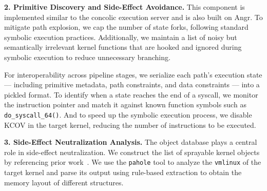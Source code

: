 \noindent\textbf{2. Primitive Discovery and Side-Effect Avoidance.}
This component is implemented similar to the concolic execution server and is also built on Angr. To mitigate path explosion, we cap the number of state forks, following standard symbolic execution practices. Additionally, we maintain a list of noisy but semantically irrelevant kernel functions that are hooked and ignored during symbolic execution to reduce unnecessary branching.

For interoperability across pipeline stages, we serialize each path's execution state --- including primitive metadata, path constraints, and data constraints --- into a pickled format. To identify when a state reaches the end of a syscall, we monitor the instruction pointer and match it against known function symbols such as \texttt{do\_syscall\_64()}. And to speed up the symbolic execution process, we disable KCOV in the target kernel, reducing the number of instructions to be executed.


\noindent\textbf{3. Side-Effect Neutralization Analysis.}
The object database plays a central role in side-effect neutralization. We construct the list of sprayable kernel objects by referencing prior work~\cite{chen2019slake,chen2020systematic,wang2023alphaexp}. We use the \texttt{pahole} tool to analyze the \texttt{vmlinux} of the target kernel and parse its output using rule-based extraction to obtain the memory layout of different structures.



